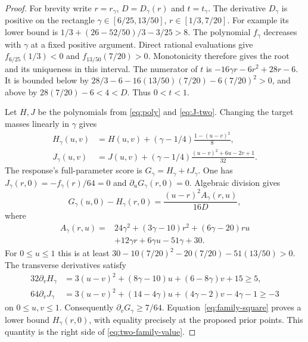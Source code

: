\begin{proof}
For brevity write $r=r_\gamma$, $D=D_\gamma(r)$ and $t=t_\gamma$.
The derivative $D_\gamma$ is positive on the rectangle
$\gamma\in[6/25,13/50]$, $r\in[1/3,7/20]$. For example its lower bound
is $1/3+(26-52/50)/3-3/25>8$. The polynomial $f_\gamma$ decreases
with $\gamma$ at a fixed positive argument. Direct rational evaluations
give $f_{6/25}(1/3)<0$ and $f_{13/50}(7/20)>0$. Monotonicity therefore
gives the root and its uniqueness in this interval. The numerator of
$t$ is $-16\gamma r-6r^2+28r-6$. It is bounded below by
$28/3-6-16(13/50)(7/20)-6(7/20)^2>0$, and above by
$28(7/20)-6<4<D$. Thus $0<t<1$.

Let $H,J$ be the polynomials from \eqref{eq:poly} and
\eqref{eq:J-two}. Changing the target masses linearly in $\gamma$ gives
\begin{align*}
 H_\gamma(u,v)&=H(u,v)+(\gamma-1/4)\frac{1-(u-v)^2}{8},\\
 J_\gamma(u,v)&=J(u,v)+(\gamma-1/4)
                    \frac{(u-v)^2+6u-2v+1}{32}.
\end{align*}
The response's full-parameter score is $G_\gamma=H_\gamma+tJ_\gamma$.
One has $J_\gamma(r,0)=-f_\gamma(r)/64=0$ and
$\partial_uG_\gamma(r,0)=0$. Algebraic division gives
\begin{equation}\label{eq:family-square}
 G_\gamma(u,0)-H_\gamma(r,0)=\frac{(u-r)^2 A_\gamma(r,u)}{16D},
\end{equation}
where
\begin{align*}
 A_\gamma(r,u)={}&24\gamma^2+(3\gamma-10)r^2+(6\gamma-20)ru\\
                 &+12\gamma r+6\gamma u-51\gamma+30.
\end{align*}
For $0\le u\le1$ this is at least
$30-10(7/20)^2-20(7/20)-51(13/50)>0$.
The transverse derivatives satisfy
\begin{align*}
 32\partial_vH_\gamma
    &=3(u-v)^2+(8\gamma-10)u+(6-8\gamma)v+15\ge5,\\
 64\partial_vJ_\gamma
    &=3(u-v)^2+(14-4\gamma)u+(4\gamma-2)v-4\gamma-1\ge-3
\end{align*}
on $0\le u,v\le1$. Consequently $\partial_vG_\gamma\ge7/64$.
Equation~\eqref{eq:family-square} proves a lower bound
$H_\gamma(r,0)$, with equality precisely at the proposed prior points.
This quantity is the right side of \eqref{eq:two-family-value}.


\end{proof}
